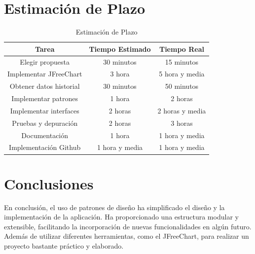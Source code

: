\documentclass{article}
\begin{document}
\section{Estimación de Plazo}
\begin{table}[H]
  \centering
  \caption{Estimación de Plazo}
  \begin{tabular}{|c|c|c|}
    \hline
    \textbf{Tarea} & \textbf{Tiempo Estimado} & \textbf{Tiempo Real} \\
    \hline
    Elegir propuesta & 30 minutos & 15 minutos \\
    Implementar JFreeChart & 3 hora & 5 hora y media \\
    Obtener datos historial & 30 minutos & 50 minutos \\
    Implementar patrones & 1 hora & 2 horas \\
    Implementar interfaces & 2 horas & 2 horas y media \\
    Pruebas y depuración & 2 horas & 3 horas \\
    Documentación & 1 hora & 1 hora y media \\
    Implementación Github & 1 hora y media & 1 hora y media \\
    \hline
  \end{tabular}
  \label{Estimación de Plazo}
\end{table}

\section{Conclusiones}
En conclusión, el uso de patrones de diseño ha simplificado el diseño y la implementación de la aplicación. Ha proporcionado una estructura modular y extensible, facilitando la incorporación de nuevas funcionalidades en algún futuro. Además de utilizar diferentes herramientas, como el JFreeChart, para realizar un proyecto bastante práctico y elaborado.
\end{document}
